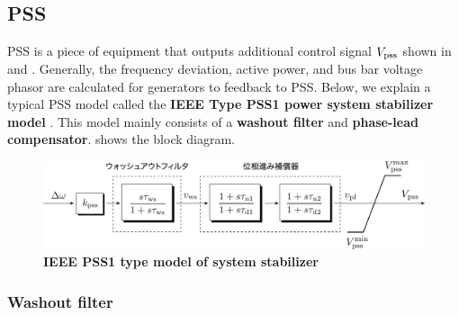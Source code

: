 \documentclass[tombow,dvipdfmx]{corona-a5-1.1}
\begin{document}
\subsection{PSS}\label{sec:pssintro}

PSS is a piece of equipment that outputs additional control signal $V_{\rm pss}$ shown in  and .
Generally, the frequency deviation, active power, and bus bar voltage phasor are calculated for generators to feedback to PSS.
Below, we explain a typical PSS model called the \textbf{IEEE Type PSS1 power system stabilizer model} \cite[Section 9.2]{ieee2016ieee}.
This model mainly consists of a \textbf{washout filter} and \textbf{phase-lead compensator}.
 shows the block diagram. 

\begin{figure}[t]
\centering
\includegraphics[width = .99\linewidth]{figs/pss1}
\medskip
\caption{\textbf{IEEE PSS1 type model of system stabilizer}}
\label{fig:pss1}
\medskip
\end{figure}


\smallskip
\subsubsection{Washout filter}
\end{document}
